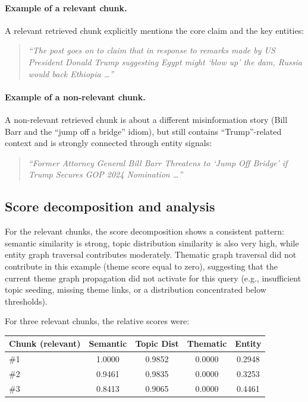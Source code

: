 \documentclass[10pt]{article}
\begin{document}
\paragraph{Example of a relevant chunk.}
A relevant retrieved chunk explicitly mentions the core claim and the key entities:
\begin{quote}
\small
\emph{``The post goes on to claim that in response to remarks made by US President Donald Trump suggesting Egypt might `blow up' the dam, Russia would back Ethiopia \ldots''}
\end{quote}

\paragraph{Example of a non-relevant chunk.}
A non-relevant retrieved chunk is about a different misinformation story (Bill Barr and the ``jump off a bridge'' idiom), but still contains ``Trump''-related context and is strongly connected through entity signals:
\begin{quote}
\small
\emph{``Former Attorney General Bill Barr Threatens to `Jump Off Bridge' if Trump Secures GOP 2024 Nomination \ldots''}
\end{quote}

\subsection{Score decomposition and analysis}

For the relevant chunks, the score decomposition shows a consistent pattern: semantic similarity is strong, topic distribution similarity is also very high, while entity graph traversal contributes moderately. Thematic graph traversal did not contribute in this example (theme score equal to zero), suggesting that the current theme graph propagation did not activate for this query (e.g., insufficient topic seeding, missing theme links, or a distribution concentrated below thresholds).

For three relevant chunks, the relative scores were:

\begin{center}
\begin{tabular}{lcccc}
\toprule
Chunk (relevant) & Semantic & Topic Dist & Thematic & Entity \\
\midrule
\#1 & 1.0000 & 0.9852 & 0.0000 & 0.2948 \\
\#2 & 0.9461 & 0.9835 & 0.0000 & 0.3253 \\
\#3 & 0.8413 & 0.9065 & 0.0000 & 0.4461 \\
\bottomrule
\end{tabular}
\end{center}
\end{document}
